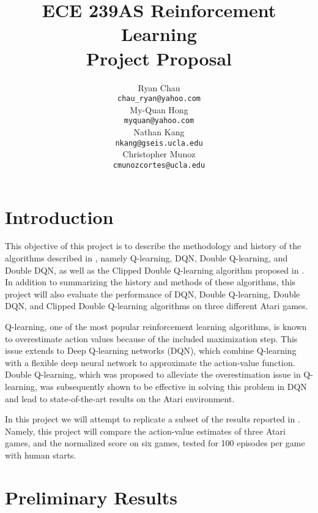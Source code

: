 \documentclass{article}
\title{ECE 239AS Reinforcement Learning\\
       Project Proposal}
\author{%
    Ryan Chau \\
    \texttt{chau\_ryan@yahoo.com}\\
    \And
    My-Quan Hong \\
    \texttt{myquan@yahoo.com} \\
    \And
    Nathan Kang \\
    \texttt{nkang@gseis.ucla.edu} \\
    \And
    Christopher Munoz \\
    \texttt{cmunozcortes@ucla.edu} \\
}
\begin{document}
\maketitle

\section{Introduction}
This objective of this project is to describe the methodology and
history of the algorithms described in \citet{van2016deep}, namely Q-learning,
DQN, Double Q-learning, and Double DQN, as well as the Clipped Double Q-learning
algorithm proposed in \citet{fujimoto2018addressing}. In addition to summarizing
the history and methods of these algorithms, this project will also evaluate the
performance of DQN, Double Q-learning, Double DQN, and Clipped Double Q-learning
algorithms on three different Atari games.

Q-learning, one of the most popular reinforcement learning algorithms, is known
to overestimate action values because of the included maximization step. This
issue extends to Deep Q-learning networks (DQN), which combine Q-learning with a
flexible deep neural network to approximate the action-value function. Double
Q-learning, which was proposed to alleviate the overestimation issue in
Q-learning, was subsequently shown to be effective in solving this problem in
DQN and lead to state-of-the-art results on the Atari environment.

In this project we will attempt to replicate a subset of the results reported in
\cite{van2016deep}. Namely, this project will compare the action-value estimates of three Atari
games, and the normalized score on six games, tested for 100 episodes per game
with human starts. 




\section{Preliminary Results}


\end{document}
